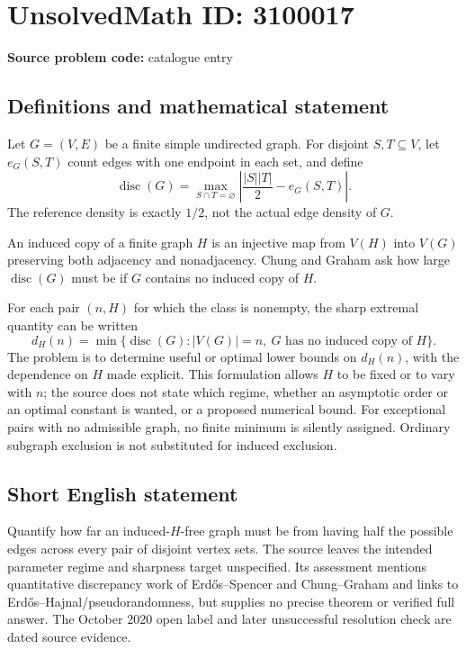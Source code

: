 \documentclass[11pt]{article}
\begin{document}
\section*{UnsolvedMath ID: 3100017}
\textbf{Source problem code:} catalogue entry
\subsection{Definitions and mathematical statement}
Let $G=(V,E)$ be a finite simple undirected graph. For disjoint $S,T\subseteq V$, let $e_G(S,T)$ count edges with one endpoint in each set, and define
\[
 \operatorname{disc}(G)=\max_{S\cap T=\varnothing}
 \left|\frac{|S||T|}{2}-e_G(S,T)\right|.
\]
The reference density is exactly $1/2$, not the actual edge density of $G$.

An induced copy of a finite graph $H$ is an injective map from $V(H)$ into $V(G)$ preserving both adjacency and nonadjacency. Chung and Graham ask how large $\operatorname{disc}(G)$ must be if $G$ contains no induced copy of $H$.

For each pair $(n,H)$ for which the class is nonempty, the sharp extremal quantity can be written
\[
 d_H(n)=\min\{\operatorname{disc}(G):|V(G)|=n,
                          \ G\text{ has no induced copy of }H\}.
\]
The problem is to determine useful or optimal lower bounds on $d_H(n)$, with the dependence on $H$ made explicit. This formulation allows $H$ to be fixed or to vary with $n$; the source does not state which regime, whether an asymptotic order or an optimal constant is wanted, or a proposed numerical bound. For exceptional pairs with no admissible graph, no finite minimum is silently assigned. Ordinary subgraph exclusion is not substituted for induced exclusion.
\subsection{Short English statement}
Quantify how far an induced-$H$-free graph must be from having half the possible edges across every pair of disjoint vertex sets. The source leaves the intended parameter regime and sharpness target unspecified. Its assessment mentions quantitative discrepancy work of Erdős--Spencer and Chung--Graham and links to Erdős--Hajnal/pseudorandomness, but supplies no precise theorem or verified full answer. The October 2020 open label and later unsuccessful resolution check are dated source evidence.
\end{document}
